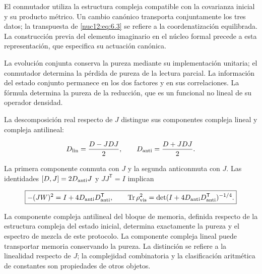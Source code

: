 El conmutador utiliza la estructura compleja compatible con la covarianza inicial y su producto métrico. Un cambio canónico transporta conjuntamente los tres datos; la transpuesta de \eqref{nuc12:eq:6.3} se refiere a la coordenatización equilibrada. La construcción previa del elemento imaginario en el núcleo formal precede a esta representación, que especifica su actuación canónica.

La evolución conjunta conserva la pureza mediante su implementación unitaria; el conmutador determina la pérdida de pureza de la lectura parcial. La información del estado conjunto permanece en los dos factores y en sus correlaciones. La fórmula determina la pureza de la reducción, que es un funcional no lineal de su operador densidad.

La descomposición real respecto de \(J\) distingue sus componentes compleja lineal y compleja antilineal:



\[
D_{\rm lin}=\frac{D-JDJ}{2},\qquad
D_{\rm anti}=\frac{D+JDJ}{2}.
\]



La primera componente conmuta con \(J\) y la segunda anticonmuta con \(J\). Las identidades
\([D,J]=2D_{\rm anti}J\) y \(JJ^{\mathsf T}=I\) implican



\begin{equation}
\boxed{-(JW)^2=I+4D_{\rm anti}D_{\rm anti}^{\mathsf T},\qquad
\operatorname{Tr}\rho_{\rm vis}^2
=\det(I+4D_{\rm anti}D_{\rm anti}^{\mathsf T})^{-1/4}.}
\label{nuc12:eq:6.6}
\end{equation}



La componente compleja antilineal del bloque de memoria, definida respecto de la estructura compleja del estado inicial, determina exactamente la pureza y el espectro de mezcla de este protocolo. La componente compleja lineal puede transportar memoria conservando la pureza. La distinción se refiere a la linealidad respecto de \(J\); la complejidad combinatoria y la clasificación aritmética de constantes son propiedades de otros objetos.

